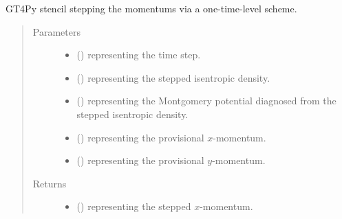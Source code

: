 \documentclass[letterpaper,10pt,english]{sphinxmanual}
\begin{document}
\begin{fulllineitems}

\begin{fulllineitems}
\label{\detokenize{api:tasmania.dycore.prognostic_isentropic_forward_euler.PrognosticIsentropicForwardEuler._stencil_stepping_by_neglecting_vertical_advection_second_defs}}
GT4Py stencil stepping the momentums via a one-time-level scheme.
\begin{quote}\begin{description}
\item[{Parameters}] \leavevmode\begin{itemize}
\item {} 
 () \textendash{}  representing the time step.

\item {} 
 () \textendash{}  representing the stepped isentropic density.

\item {} 
 () \textendash{}  representing the Montgomery potential diagnosed from the stepped isentropic density.

\item {} 
 () \textendash{}  representing the provisional \(x\)-momentum.

\item {} 
 () \textendash{}  representing the provisional \(y\)-momentum.

\end{itemize}

\item[{Returns}] \leavevmode
\begin{itemize}
\item {} 
 () \textendash{}  representing the stepped \(x\)-momentum.


\end{itemize}
\end{description}
\end{quote}
\end{fulllineitems}
\end{fulllineitems}
\end{document}
